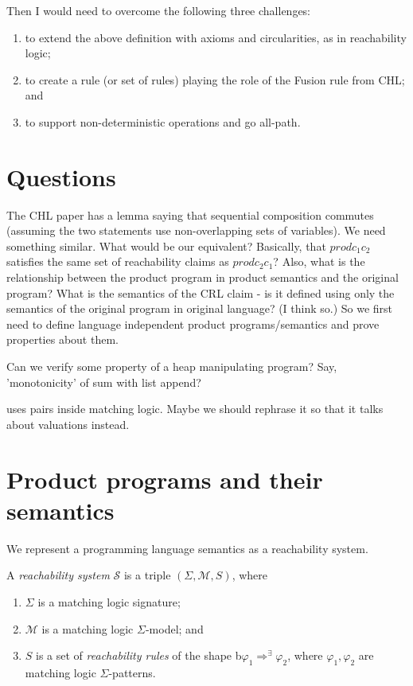 \documentclass{article}
\begin{document}
Then I would need to overcome the following three challenges:
\begin{enumerate}
    \item to extend the above definition with axioms and circularities, as in reachability logic;
    \item to create a rule (or set of rules) playing the role of the Fusion rule from CHL; and
    \item to support non-deterministic operations and go all-path.
\end{enumerate}

\section{Questions}

The CHL paper has a lemma saying that sequential composition commutes (assuming the two statements use non-overlapping sets of variables).
We need something similar. What would be our equivalent? Basically, that
$\mathit{prod} c_1 c_2$ satisfies the same set of reachability claims as $\mathit{prod} c_2 c_1$?
Also, what is the relationship between the product program in product semantics and the original program? What is the semantics of the CRL claim - is it defined using only the semantics of the original program in original language? (I think so.) So we first need to define language independent product programs/semantics and prove properties about them.

Can we verify some property of a heap manipulating program? Say, 'monotonicity' of sum with list append?


 uses pairs inside matching logic. Maybe we should rephrase it so that it talks about valuations instead.

\section{Product programs and their semantics}
We represent a programming language semantics as a reachability system.
\begin{definition}\label{def:RLsystem}
A \emph{reachability system} $\mathcal{S}$ is a triple $(\Sigma, \mathcal{M}, S)$, where
\begin{enumerate}
    \item $\Sigma$ is a matching logic signature;
    \item $\mathcal{M}$ is a matching logic $\Sigma$-model; and
    \item $S$ is a set of \emph{reachability rules} of the shape
    b$\varphi_1 \Rightarrow^\exists \varphi_2$, where $\varphi_1,\varphi_2$ are matching logic $\Sigma$-patterns.
\end{enumerate}
\end{definition}
\end{document}

